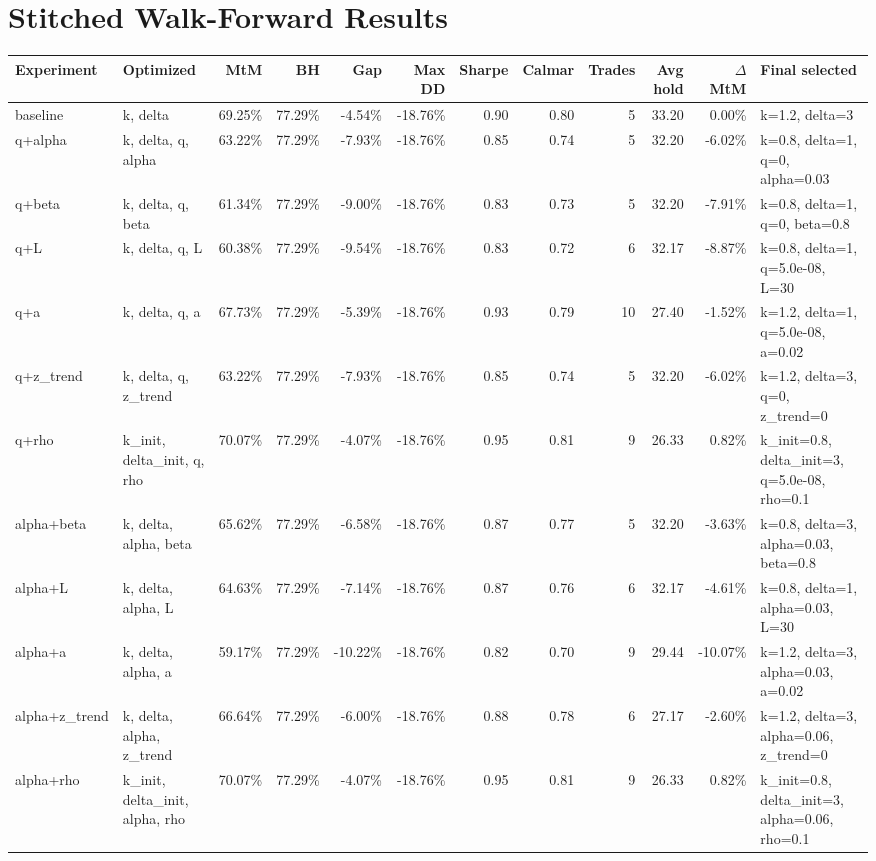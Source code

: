 \documentclass[10pt]{article}
\begin{document}
\section*{Stitched Walk-Forward Results}
\scriptsize
\setlength{\tabcolsep}{3pt}
\begin{longtable}{p{0.9in}p{1.25in}rrrrrrrrrp{1.45in}}
\toprule
Experiment & Optimized & MtM & BH & Gap & Max DD & Sharpe & Calmar & Trades & Avg hold & $\Delta$ MtM & Final selected \\
\midrule
baseline & k, delta & 69.25\% & 77.29\% & -4.54\% & -18.76\% & 0.90 & 0.80 & 5 & 33.20 & 0.00\% & k=1.2, delta=3 \\
q+alpha & k, delta, q, alpha & 63.22\% & 77.29\% & -7.93\% & -18.76\% & 0.85 & 0.74 & 5 & 32.20 & -6.02\% & k=0.8, delta=1, q=0, alpha=0.03 \\
q+beta & k, delta, q, beta & 61.34\% & 77.29\% & -9.00\% & -18.76\% & 0.83 & 0.73 & 5 & 32.20 & -7.91\% & k=0.8, delta=1, q=0, beta=0.8 \\
q+L & k, delta, q, L & 60.38\% & 77.29\% & -9.54\% & -18.76\% & 0.83 & 0.72 & 6 & 32.17 & -8.87\% & k=0.8, delta=1, q=5.0e-08, L=30 \\
q+a & k, delta, q, a & 67.73\% & 77.29\% & -5.39\% & -18.76\% & 0.93 & 0.79 & 10 & 27.40 & -1.52\% & k=1.2, delta=1, q=5.0e-08, a=0.02 \\
q+z\_trend & k, delta, q, z\_trend & 63.22\% & 77.29\% & -7.93\% & -18.76\% & 0.85 & 0.74 & 5 & 32.20 & -6.02\% & k=1.2, delta=3, q=0, z\_trend=0 \\
q+rho & k\_init, delta\_init, q, rho & 70.07\% & 77.29\% & -4.07\% & -18.76\% & 0.95 & 0.81 & 9 & 26.33 & 0.82\% & k\_init=0.8, delta\_init=3, q=5.0e-08, rho=0.1 \\
alpha+beta & k, delta, alpha, beta & 65.62\% & 77.29\% & -6.58\% & -18.76\% & 0.87 & 0.77 & 5 & 32.20 & -3.63\% & k=0.8, delta=3, alpha=0.03, beta=0.8 \\
alpha+L & k, delta, alpha, L & 64.63\% & 77.29\% & -7.14\% & -18.76\% & 0.87 & 0.76 & 6 & 32.17 & -4.61\% & k=0.8, delta=1, alpha=0.03, L=30 \\
alpha+a & k, delta, alpha, a & 59.17\% & 77.29\% & -10.22\% & -18.76\% & 0.82 & 0.70 & 9 & 29.44 & -10.07\% & k=1.2, delta=3, alpha=0.03, a=0.02 \\
alpha+z\_trend & k, delta, alpha, z\_trend & 66.64\% & 77.29\% & -6.00\% & -18.76\% & 0.88 & 0.78 & 6 & 27.17 & -2.60\% & k=1.2, delta=3, alpha=0.06, z\_trend=0 \\
alpha+rho & k\_init, delta\_init, alpha, rho & 70.07\% & 77.29\% & -4.07\% & -18.76\% & 0.95 & 0.81 & 9 & 26.33 & 0.82\% & k\_init=0.8, delta\_init=3, alpha=0.06, rho=0.1 \\

\end{longtable}
\end{document}
